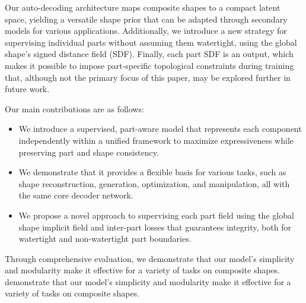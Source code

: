Our auto-decoding architecture maps composite shapes to a compact latent space, yielding a versatile shape prior that can be adapted through secondary models for various applications.  Additionally, we introduce a new strategy for supervising individual parts without assuming them watertight, using the global shape's signed distance field (SDF). Finally, each part SDF is an output, which makes it possible to impose part-specific topological constraints during training that, although not the primary focus of this paper, may be explored further in future work.

Our main contributions are as follows:
%
\begin{itemize}
	\item We introduce a supervised, part-aware model that represents each component independently within a unified framework to maximize expressiveness while preserving part and shape consistency.
	\item We demonstrate that it  provides a flexible basis for various tasks, such as shape reconstruction, generation, optimization, and manipulation, all with the same core decoder network.
	\item We propose a novel approach to supervising each part field using the global shape implicit field and inter-part losses that guarantees integrity, both for watertight and non-watertight part boundaries.
\end{itemize}
%
Through comprehensive evaluation, we demonstrate that our model’s simplicity and modularity make it effective for a variety of tasks on composite shapes.
 demonstrate that our model’s simplicity and modularity make it effective for a variety of tasks on composite shapes.

\fi
